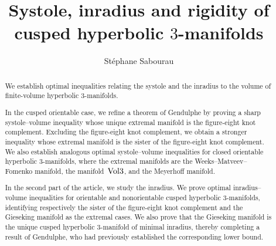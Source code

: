 \documentclass[11pt,reqno]{amsart}
\title{Systole, inradius and rigidity of cusped hyperbolic $3$-manifolds}
\author[S.~Sabourau]{St\'ephane Sabourau}
\theoremstyle{definition}
\numberwithin{equation}{section}
\newcommand{\HH}{{\mathbb H}}
\newcommand\RR{{\rm R}}
\DeclareMathOperator{\vol}{{\rm vol}}
\DeclareMathOperator{\sys}{{\rm sys}}
\numberwithin{equation}{section}
\begin{document}



\begin{abstract}
We establish optimal inequalities relating the systole and the inradius to the volume of finite-volume hyperbolic $3$-manifolds.


In the cusped orientable case, we refine a theorem of Gendulphe by proving a sharp systole--volume inequality whose unique extremal manifold is the figure-eight knot complement. 
Excluding the figure-eight knot complement, we obtain a stronger inequality whose extremal manifold is the sister of the figure-eight knot complement. 
We also establish analogous optimal systole--volume inequalities for closed orientable hyperbolic $3$-manifolds, where the extremal manifolds are the Weeks--Matveev--Fomenko manifold, the manifold~${\rm Vol}3$, and the Meyerhoff manifold.

In the second part of the article, we study the inradius. 
We prove optimal inradius--volume inequalities for orientable and nonorientable cusped hyperbolic $3$-manifolds, identifying respectively the sister of the figure-eight knot complement and the Gieseking manifold as the extremal cases. 
We also prove that the Gieseking manifold is the unique cusped hyperbolic $3$-manifold of minimal inradius, thereby completing a result of Gendulphe, who had previously established the corresponding lower bound.
%
\end{abstract}

\maketitle
\end{document}
